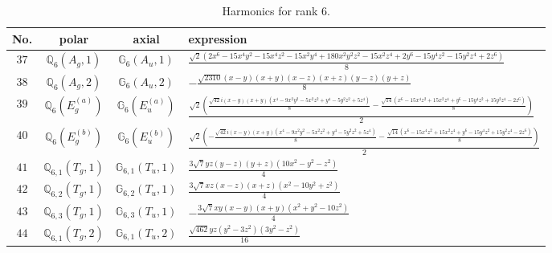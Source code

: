 \documentclass[fleqn,8pt,landscape]{jsarticle}
\begin{document}
\begin{table}[ht!]
\begin{center}
\caption{Harmonics for rank 6.}
\renewcommand{\arraystretch}{1.3}
\begin{tabular}{cccl} \hline \hline
No. & polar & axial & expression \\ \hline
$ 37 $ & $ \mathbb{Q}_{6}(A_{g},1) $ & $ \mathbb{G}_{6}(A_{u},1) $ & $ \frac{\sqrt{2} \left(2 x^{6} - 15 x^{4} y^{2} - 15 x^{4} z^{2} - 15 x^{2} y^{4} + 180 x^{2} y^{2} z^{2} - 15 x^{2} z^{4} + 2 y^{6} - 15 y^{4} z^{2} - 15 y^{2} z^{4} + 2 z^{6}\right)}{8} $ \\
$ 38 $ & $ \mathbb{Q}_{6}(A_{g},2) $ & $ \mathbb{G}_{6}(A_{u},2) $ & $ - \frac{\sqrt{2310} \left(x - y\right) \left(x + y\right) \left(x - z\right) \left(x + z\right) \left(y - z\right) \left(y + z\right)}{8} $ \\
$ 39 $ & $ \mathbb{Q}_{6}(E_{g}^{(a)}) $ & $ \mathbb{G}_{6}(E_{u}^{(a)}) $ & $ \frac{\sqrt{2} \left(\frac{\sqrt{42} i \left(x - y\right) \left(x + y\right) \left(x^{4} - 9 x^{2} y^{2} - 5 x^{2} z^{2} + y^{4} - 5 y^{2} z^{2} + 5 z^{4}\right)}{8} - \frac{\sqrt{14} \left(x^{6} - 15 x^{4} z^{2} + 15 x^{2} z^{4} + y^{6} - 15 y^{4} z^{2} + 15 y^{2} z^{4} - 2 z^{6}\right)}{8}\right)}{2} $ \\
$ 40 $ & $ \mathbb{Q}_{6}(E_{g}^{(b)}) $ & $ \mathbb{G}_{6}(E_{u}^{(b)}) $ & $ \frac{\sqrt{2} \left(- \frac{\sqrt{42} i \left(x - y\right) \left(x + y\right) \left(x^{4} - 9 x^{2} y^{2} - 5 x^{2} z^{2} + y^{4} - 5 y^{2} z^{2} + 5 z^{4}\right)}{8} - \frac{\sqrt{14} \left(x^{6} - 15 x^{4} z^{2} + 15 x^{2} z^{4} + y^{6} - 15 y^{4} z^{2} + 15 y^{2} z^{4} - 2 z^{6}\right)}{8}\right)}{2} $ \\
$ 41 $ & $ \mathbb{Q}_{6,1}(T_{g},1) $ & $ \mathbb{G}_{6,1}(T_{u},1) $ & $ \frac{3 \sqrt{7} y z \left(y - z\right) \left(y + z\right) \left(10 x^{2} - y^{2} - z^{2}\right)}{4} $ \\
$ 42 $ & $ \mathbb{Q}_{6,2}(T_{g},1) $ & $ \mathbb{G}_{6,2}(T_{u},1) $ & $ \frac{3 \sqrt{7} x z \left(x - z\right) \left(x + z\right) \left(x^{2} - 10 y^{2} + z^{2}\right)}{4} $ \\
$ 43 $ & $ \mathbb{Q}_{6,3}(T_{g},1) $ & $ \mathbb{G}_{6,3}(T_{u},1) $ & $ - \frac{3 \sqrt{7} x y \left(x - y\right) \left(x + y\right) \left(x^{2} + y^{2} - 10 z^{2}\right)}{4} $ \\
$ 44 $ & $ \mathbb{Q}_{6,1}(T_{g},2) $ & $ \mathbb{G}_{6,1}(T_{u},2) $ & $ \frac{\sqrt{462} y z \left(y^{2} - 3 z^{2}\right) \left(3 y^{2} - z^{2}\right)}{16} $ \\

\end{tabular}
\end{center}
\end{table}
\end{document}

